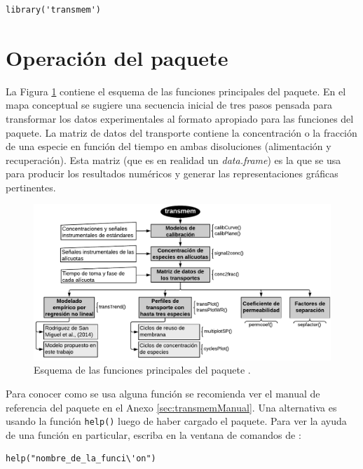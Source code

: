 \begin{lstlisting}[belowskip=-2.6\baselineskip]
library('transmem')
\end{lstlisting}

\clearpage
\section{Operación del paquete}
La Figura \ref{fig:chap4esquema} contiene el esquema de las funciones principales del paquete. En el mapa conceptual se sugiere una secuencia inicial de tres pasos pensada para transformar los datos experimentales al formato apropiado para las funciones del paquete. La matriz de datos del transporte contiene la concentración o la fracción de una especie en función del tiempo en ambas disoluciones (alimentación y recuperación). Esta matriz (que es en realidad un \textit{data.frame}) es la que se usa para producir los resultados numéricos y generar las representaciones gráficas pertinentes.

{
\begin{figure}[H]
    \includegraphics[width=\textwidth]{chap4/Chapter4Thesis.pdf}
    \caption{Esquema de las funciones principales del paquete \trm.}
    \label{fig:chap4esquema}
\end{figure}
}

Para conocer como se usa alguna función se recomienda ver el manual de referencia del paquete en el Anexo \ref{sec:transmemManual}. Una alternativa es usando la función \verb|help()| luego de haber cargado el paquete. Para ver la ayuda de una función en particular, escriba en la ventana de comandos de \R: 
\begin{lstlisting}
help("nombre_de_la_funci\'on")
\end{lstlisting}

